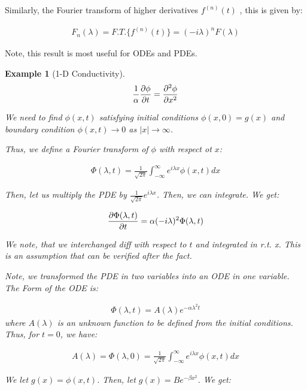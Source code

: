 \documentclass{article}
\newtheorem{ex}{Example}
\theoremstyle{definition}
\begin{document}
Similarly, the Fourier transform of higher derivatives $f^{(n)}(t)$ , this is given by:

\begin{align}
F_n(\lambda) = F.T. \{f^{(n)}(t)\} = (-i\lambda)^n F(\lambda)
\end{align}

Note, this result is most useful for ODEs and PDEs.

\begin{ex}[1-D Conductivity]
\begin{align*}
\frac{1}{\alpha} \pdv{\phi}{t} = \pdv{ ^2 \phi}{x^2}
\end{align*}

We need to find $\phi(x,t)$ satisfying initial conditions $\phi(x,0) = g(x)$ and boundary condition $\phi(x,t) \to 0$ as $|x| \to \infty$. 

Thus, we define a Fourier transform of $\phi$ with respect ot $x$:

\begin{align*}
\Phi(\lambda, t) = \frac{1}{\sqrt{2 \pi}} \int_{-\infty}^{\infty}  e^{i\lambda x} \phi(x,t) dx
\end{align*}

Then, let us multiply the PDE by $\frac{1}{\sqrt{2 \pi}}  e^{i\lambda x}$. Then, we can integrate. We get:

\begin{align*}
\pdv{\Phi(\lambda, t)}{t} = \alpha (-i\lambda)^2\Phi(\lambda, t)
\end{align*}

We note, that we interchanged diff with respect to $t$ and integrated in r.t. x. This is an assumption that can be verified after the fact.

Note, we transformed the PDE in two variables into an ODE in one variable. The Form of the ODE is:

\begin{align*}
\Phi(\lambda, t) = A(\lambda) e^{-\alpha \lambda^2 t}
\end{align*}
where $A(\lambda)$ is an unknown function to be defined from the initial conditions. Thus, for $t=0$, we have:

\begin{align*}
A(\lambda) = \Phi(\lambda, 0) = \frac{1}{\sqrt{2 \pi}} \int_{-\infty}^{\infty}  e^{i\lambda x} \phi(x,t) dx
\end{align*}

We let $g(x) = \phi(x,t)$. Then, let $g(x) = B e^{-\beta x^2}$. We get:


\end{ex}
\end{document}
